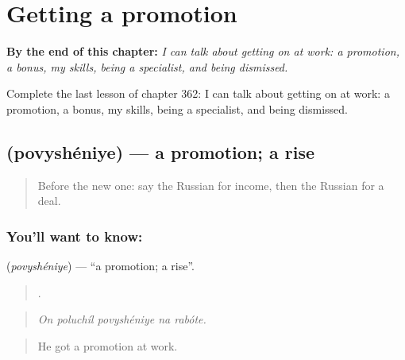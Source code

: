 
\chapter{Getting a promotion}
\label{ch:ru-getting-a-promotion}

\begin{chapteropening}
\textbf{By the end of this chapter:} \emph{I can talk about getting on at work: a promotion, a bonus, my skills, being a specialist, and being dismissed.}

Complete the last lesson of chapter 362: I can talk about getting on at work: a promotion, a bonus, my skills, being a specialist, and being dismissed.
\end{chapteropening}

\section[\texorpdfstring{\ru{повышение} (povyshéniye)}{повышение (povyshéniye)}]{ (povyshéniye) — a promotion; a rise}

\label{lesson:RU-C362-povyshenie}



\begin{quote}
Before the new one: say the Russian for income, then the Russian for a deal.
\end{quote}

\subsection*{You'll want to know: }
\textbf{} (\emph{povyshéniye}) — \textquotedblleft{}a promotion; a rise\textquotedblright{}.

\begin{quote}
    .
\end{quote}

\begin{quote}
\emph{On poluchíl povyshéniye na rabóte.}
\end{quote}

\begin{quote}
He got a promotion at work.
\end{quote}

